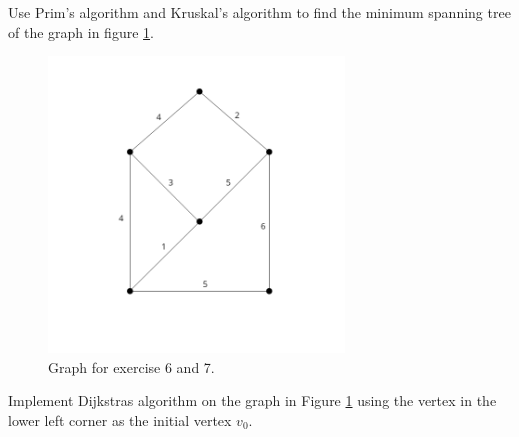 \documentclass[nobib]{tufte-handout}
\begin{document}
\begin{xca}
Use Prim's algorithm and Kruskal's algorithm to find the minimum spanning tree of the graph in figure \ref{fig:new_exercise}.
\begin{figure}
    \centering
    \includegraphics[width=0.7\textwidth]{graphics/L6_prim_kruskal_dijkstra/graph_exc6-7.png}
    \caption{Graph for exercise 6 and 7.}
    \label{fig:new_exercise}
\end{figure}
\end{xca}

\begin{xca}
Implement Dijkstras algorithm on the graph in Figure \ref{fig:new_exercise} using the vertex in the lower left corner as the initial vertex $v_0$.
\end{xca}


%
%
\end{document}
